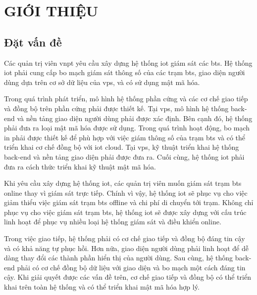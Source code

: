 \chapter{GIỚI THIỆU}
\label{Chapter1}

\section{Đặt vấn đề}

Các quản trị viên \acrfull{vnpt} yêu cầu xây dựng hệ thống \acrfull{iot} giám sát các \acrfull{bts}. Hệ thống \acrshort{iot} phải cung cấp bo mạch giám sát thông số của các trạm \acrshort{bts}, giao diện người dùng dựa trên cơ sở dữ liệu của \acrfull{vps}, và có sử dụng mật mã hóa.

Trong quá trình phát triển, mô hình hệ thống phần cứng và các cơ chế giao tiếp và đồng bộ trên phần cứng phải được thiết kế. Tại \acrshort{vps}, mô hình hệ thống back-end và nền tảng giao diện người dùng phải được xác định. Bên cạnh đó, hệ thống phải đưa ra loại mật mã hóa được sử dụng. Trong quá trình hoạt động, bo mạch in phải được thiết kế để phù hợp với việc giám thông số của trạm \acrshort{bts} và có thể triển khai cơ chế đồng bộ với \acrshort{iot} cloud. Tại \acrshort{vps}, kỹ thuật triển khai hệ thống back-end và nền tảng giao diện phải được đưa ra. Cuối cùng, hệ thống \acrshort{iot} phải đưa ra cách thức triển khai kỹ thuật mật mã hóa.

Khi yêu cầu xây dựng hệ thống \acrshort{iot}, các quản trị viên muốn giám sát trạm \acrshort{bts} online thay vì giám sát trực tiếp. Chính vì vậy, hệ thống \acrshort{iot} sẽ phục vụ cho việc giảm thiểu việc giám sát trạm \acrshort{bts} offline và chi phí di chuyển tới trạm. 
Không chỉ phục vụ cho việc giám sát trạm \acrshort{bts}, hệ thống \acrshort{iot} sẽ được xây dựng với cấu trúc linh hoạt để phục vụ nhiều loại hệ thống giám sát và điều khiển online.

Trong việc giao tiếp, hệ thống phải có cơ chế giao tiếp và đồng bộ đáng tin cậy và có khả năng tự phục hồi. Hơn nữa, giao diện người dùng phải linh hoạt để dễ dàng thay đổi các thành phần hiển thị của người dùng. Sau cùng, hệ thống back-end phải có cơ chế đồng bộ dữ liệu với giao diện và bo mạch một cách đáng tin cậy. Khi giải quyết được các vấn đề trên, cơ chế giao tiếp và đồng bộ có thể triển khai trên toàn hệ thống và có thể triển khai mật mã hóa hợp lý.


